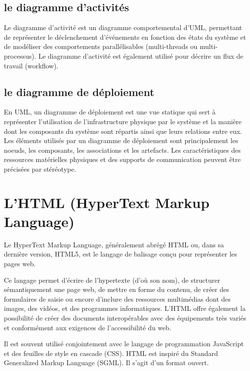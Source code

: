 \subsection{le diagramme d'activités}\label{subsec:diagrammes-d-activites}
Le diagramme d'activité est un diagramme comportemental d'UML, permettant de représenter
le déclenchement d'événements en fonction des états du système et de modéliser des
comportements parallélisables (multi-threads ou multi-processus).
Le diagramme d'activité est également utilisé pour décrire un flux de travail (workflow).

\subsection{le diagramme de déploiement}\label{subsec:diagrammes-de-deploiement}
En UML, un diagramme de déploiement\cite{diagramme_de_deploiement} est une vue statique qui sert à représenter
l'utilisation de l'infrastructure physique par le système et la manière dont
les composants du système sont répartis ainsi que leurs relations entre eux.
Les éléments utilisés par un diagramme de déploiement sont principalement les noeuds,
les composants, les associations et les artefacts.
Les caractéristiques des ressources matérielles physiques et
des supports de communication peuvent être précisées par stéréotype.

\section{L'HTML (HyperText Markup Language)}\label{sec:html}
Le HyperText Markup Language, généralement abrégé HTML ou, dans sa dernière version, HTML5,
est le langage de balisage conçu pour représenter les pages web.

Ce langage permet d’écrire de l’hypertexte (d’où son nom), de structurer sémantiquement
une page web, de mettre en forme du contenu, de créer des formulaires de saisie ou encore
d’inclure des ressources multimédias dont des images, des vidéos, et des programmes informatiques.
L'HTML offre également la possibilité de créer des documents interopérables avec des équipements
très variés et conformément aux exigences de l’accessibilité du web.

Il est souvent utilisé conjointement avec le langage de programmation JavaScript et des
feuilles de style en cascade (CSS). HTML est inspiré du Standard Generalized Markup Language (SGML).
Il s'agit d'un format ouvert.

